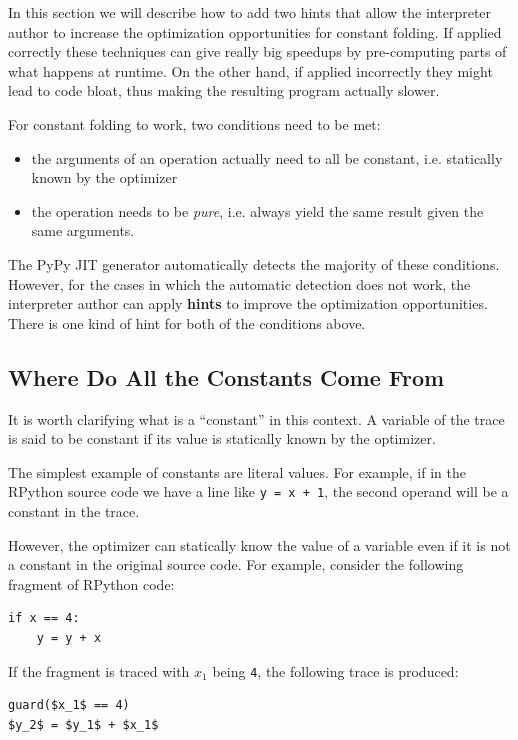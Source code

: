 \documentclass{sigplanconf}
\begin{document}
In this section we will describe how to add two hints that allow the
interpreter author to increase the optimization opportunities for constant
folding. If applied correctly these techniques can give really big speedups by
pre-computing parts of what happens at runtime. On the other
hand, if applied incorrectly they might lead to code bloat, thus making the
resulting program actually slower.

For constant folding to work, two conditions need to be met:

\begin{itemize}
    \item the arguments of an operation actually need to all be constant,
    i.e. statically known by the optimizer
    \item the operation needs to be \emph{pure}, i.e. always yield the same result given
    the same arguments.
\end{itemize}

The PyPy JIT generator automatically detects the majority of these conditions.
However, for the cases in which the automatic detection does not work, the
interpreter author can apply \textbf{hints} to improve the optimization
opportunities. There is one kind of hint for both of the conditions above.


\subsection{Where Do All the Constants Come From}

It is worth clarifying what is a ``constant'' in this context.  A variable of
the trace is said to be constant if its value is statically known by the
optimizer.

The simplest example of constants are literal values.  For example, if in the
RPython source code we have a line like \texttt{y = x + 1}, the second operand will
be a constant in the trace.

However, the optimizer can statically know the value of a variable even if it
is not a constant in the original source code. For example, consider the
following fragment of RPython code:

\begin{lstlisting}[mathescape,basicstyle=\ttfamily]
if x == 4:
    y = y + x
\end{lstlisting}

If the fragment is traced with $x_1$ being \texttt{4}, the following trace is
produced:
%
\begin{lstlisting}[mathescape,basicstyle=\ttfamily]
guard($x_1$ == 4)
$y_2$ = $y_1$ + $x_1$
\end{lstlisting}
\end{document}
